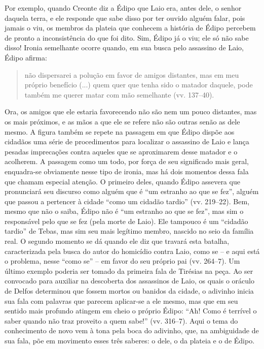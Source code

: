 Por exemplo, quando Creonte diz a Édipo que Laio era, antes dele, o
senhor daquela terra, e ele responde que sabe disso por ter ouvido
alguém falar, pois jamais o viu, os membros da plateia que conhecem a
história de Édipo percebem de pronto a inconsistência do que foi dito.
Sim, Édipo já o viu; ele só não sabe disso! Ironia semelhante ocorre
quando, em sua busca pelo assassino de Laio, Édipo afirma: 

\begin{quote}
não dispersarei a polução em favor de amigos distantes, mas em meu próprio
benefício (...) quem quer que tenha sido o matador daquele, pode
também me querer matar com mão semelhante (vv. 137--40). 
\end{quote}

Ora, os amigos que ele estaria favorecendo não são nem um pouco distantes, mas os mais
próximos, e as mãos a que ele se refere não são outras senão as dele
mesmo. A figura também se repete na passagem em que Édipo dispõe aos
cidadãos uma série de procedimentos para localizar o assassino de Laio e
lança pesadas imprecações contra aqueles que se aproximarem desse
matador e o acolherem. A passagem como um todo, por força de seu
significado mais geral, enquadra-se obviamente nesse tipo de ironia, mas
há dois momentos dessa fala que chamam especial atenção. O primeiro
deles, quando Édipo assevera que pronunciará seu discurso como alguém
que é ``um estranho ao que se fez'', alguém que passou a pertencer à
cidade ``como um cidadão tardio'' (vv. 219--22). Bem, mesmo que não o
saiba, Édipo não é ``um estranho ao que se fez'', mas sim o responsável
pelo que se fez (pela morte de Laio). Ele tampouco é um ``cidadão
tardio'' de Tebas, mas sim seu mais legítimo membro, nascido no seio da
família real. O segundo momento se dá quando ele diz que travará esta
batalha, caracterizada pela busca do autor do homicídio contra Laio,
como se -- e aqui está o problema, nesse ``como se'' -- em favor do seu
próprio pai (vv. 264--7). Um último exemplo poderia ser tomado da
primeira fala de Tirésias na peça. Ao ser convocado para auxiliar na
descoberta dos assassinos de Laio, os quais o oráculo de Delfos
determinou que fossem mortos ou banidos da cidade, o adivinho inicia sua
fala com palavras que parecem aplicar-se a ele mesmo, mas que em seu
sentido mais profundo atingem em cheio o próprio Édipo: ``Ah! Como é
terrível o saber quando não traz proveito a quem sabe!'' (vv. 316--7).
Aqui o tema do conhecimento de novo vem à tona pela boca do adivinho,
que, na ambiguidade de sua fala, põe em movimento esses três saberes: o
dele, o da plateia e o de Édipo.

